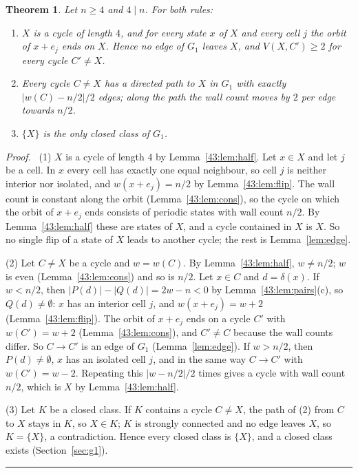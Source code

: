 \documentclass[10pt,a4paper]{article}
\newtheorem{theorem}{Theorem}[section]
\newcommand{\qedmark}{\rule{1.1ex}{1.1ex}}
\newenvironment{proof}[1][Proof]{\par\smallskip\noindent\textit{#1.}\ }{\hfill\qedmark\par\smallskip}
\newcommand{\Gone}{G_1}                       %
\begin{document}
\begin{theorem}\label{43:thm:crystal}
Let $n\ge 4$ and $4\mid n$. For both rules:
\begin{enumerate}[label=(\arabic*),nosep,leftmargin=*]
\item $X$ is a cycle of length $4$, and for every state $x$ of $X$ and every cell $j$ the orbit of $x+e_j$ ends
on $X$. Hence no edge of $\Gone$ leaves $X$, and $V(X,C')\ge 2$ for every cycle $C'\ne X$.
\item Every cycle $C\ne X$ has a directed path to $X$ in $\Gone$ with exactly $|w(C)-n/2|/2$ edges; along the
path the wall count moves by $2$ per edge towards $n/2$.
\item $\{X\}$ is the only closed class of $\Gone$.
\end{enumerate}
\end{theorem}
\begin{proof}
(1) $X$ is a cycle of length $4$ by Lemma~\ref{43:lem:half}. Let $x\in X$ and let $j$ be a cell. In $x$ every
cell has exactly one equal neighbour, so cell $j$ is neither interior nor isolated, and $w(x+e_j)=n/2$ by
Lemma~\ref{43:lem:flip}. The wall count is constant along the orbit (Lemma~\ref{43:lem:cons}), so the cycle on
which the orbit of $x+e_j$ ends consists of periodic states with wall count $n/2$. By Lemma~\ref{43:lem:half}
these are states of $X$, and a cycle contained in $X$ is $X$. So no single flip of a state of $X$ leads to
another cycle; the rest is Lemma~\ref{lem:edge}.

(2) Let $C\ne X$ be a cycle and $w=w(C)$. By Lemma~\ref{43:lem:half}, $w\ne n/2$; $w$ is even
(Lemma~\ref{43:lem:cons}) and so is $n/2$. Let $x\in C$ and $d=\delta(x)$. If $w<n/2$, then
$|P(d)|-|Q(d)|=2w-n<0$ by Lemma~\ref{43:lem:pairs}(c), so $Q(d)\ne\emptyset$: $x$ has an interior cell $j$, and
$w(x+e_j)=w+2$ (Lemma~\ref{43:lem:flip}). The orbit of $x+e_j$ ends on a cycle $C'$ with $w(C')=w+2$
(Lemma~\ref{43:lem:cons}), and $C'\ne C$ because the wall counts differ. So $C\to C'$ is an edge of $\Gone$
(Lemma~\ref{lem:edge}). If $w>n/2$, then $P(d)\ne\emptyset$, $x$ has an isolated cell $j$, and in the same way
$C\to C'$ with $w(C')=w-2$. Repeating this $|w-n/2|/2$ times gives a cycle with wall count $n/2$, which is $X$ by
Lemma~\ref{43:lem:half}.

(3) Let $K$ be a closed class. If $K$ contains a cycle $C\ne X$, the path of (2) from $C$ to $X$ stays in $K$, so
$X\in K$; $K$ is strongly connected and no edge leaves $X$, so $K=\{X\}$, a contradiction. Hence every closed
class is $\{X\}$, and a closed class exists (Section~\ref{sec:g1}).
\end{proof}
\end{document}
